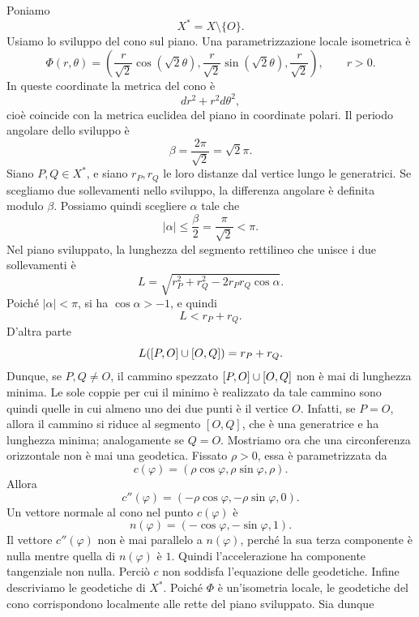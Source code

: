 \documentclass[a4paper]{article}
\begin{document}
\begin{snippetsolution}{}
    Poniamo
    \[
        X^*=X\setminus\{O\}.
    \]
    Usiamo lo sviluppo del cono sul piano. Una parametrizzazione locale isometrica è
    \[
        \Phi(r,\theta)
        =
        \left(
            \frac{r}{\sqrt{2}}\cos(\sqrt{2}\theta),
            \frac{r}{\sqrt{2}}\sin(\sqrt{2}\theta),
            \frac{r}{\sqrt{2}}
        \right),
        \qquad r>0.
    \]
    In queste coordinate la metrica del cono è
    \[
        dr^2+r^2d\theta^2,
    \]
    cioè coincide con la metrica euclidea del piano in coordinate polari. Il periodo angolare dello sviluppo è
    \[
        \beta=\frac{2\pi}{\sqrt{2}}=\sqrt{2}\pi.
    \]
    Siano \(P,Q\in X^*\), e siano \(r_P,r_Q\) le loro distanze dal vertice lungo le generatrici. Se scegliamo due sollevamenti nello sviluppo, la differenza angolare è definita modulo \(\beta\). Possiamo quindi scegliere \(\alpha\) tale che
    \[
        |\alpha|\leq \frac{\beta}{2}=\frac{\pi}{\sqrt{2}}<\pi.
    \]
    Nel piano sviluppato, la lunghezza del segmento rettilineo che unisce i due sollevamenti è
    \[
        L=
        \sqrt{
            r_P^2+r_Q^2-2r_Pr_Q\cos\alpha
        }.
    \]
    Poiché \(|\alpha|<\pi\), si ha \(\cos\alpha>-1\), e quindi
    \[
        L<r_P+r_Q.
    \]
    D'altra parte
    \[
        L([P,O]\cup[O,Q])=r_P+r_Q.
    \]
    Dunque, se \(P,Q\neq O\), il cammino spezzato \([P,O]\cup[O,Q]\) non è mai di lunghezza minima. Le sole coppie per cui il minimo è realizzato da tale cammino sono quindi quelle in cui almeno uno dei due punti è il vertice \(O\). Infatti, se \(P=O\), allora il cammino si riduce al segmento \([O,Q]\), che è una generatrice e ha lunghezza minima; analogamente se \(Q=O\).
    Mostriamo ora che una circonferenza orizzontale non è mai una geodetica. Fissato \(\rho>0\), essa è parametrizzata da
    \[
        c(\varphi)=(\rho\cos\varphi,\rho\sin\varphi,\rho).
    \]
    Allora
    \[
        c''(\varphi)=(-\rho\cos\varphi,-\rho\sin\varphi,0).
    \]
    Un vettore normale al cono nel punto \(c(\varphi)\) è
    \[
        n(\varphi)=(-\cos\varphi,-\sin\varphi,1).
    \]
    Il vettore \(c''(\varphi)\) non è mai parallelo a \(n(\varphi)\), perché la sua terza componente è nulla mentre quella di \(n(\varphi)\) è \(1\). Quindi l'accelerazione ha componente tangenziale non nulla. Perciò \(c\) non soddisfa l'equazione delle geodetiche.
    Infine descriviamo le geodetiche di \(X^*\). Poiché \(\Phi\) è un'isometria locale, le geodetiche del cono corrispondono localmente alle rette del piano sviluppato. Sia dunque
    \[
\]
\end{snippetsolution}
\end{document}
